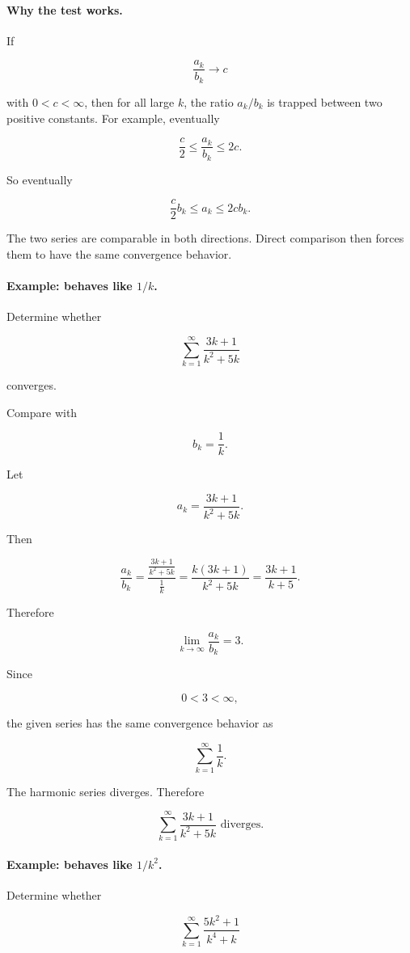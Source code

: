 \paragraph{Why the test works.}
If

\[
\frac{a_k}{b_k}\to c
\]

with \(0<c<\infty\), then for all large \(k\), the ratio \(a_k/b_k\) is trapped between two
positive constants.  For example, eventually

\[
\frac c2\le \frac{a_k}{b_k}\le 2c.
\]

So eventually

\[
\frac c2 b_k\le a_k\le 2c b_k.
\]

The two series are comparable in both directions.  Direct comparison then forces them
to have the same convergence behavior.

\paragraph{Example: behaves like \(1/k\).}
Determine whether

\[
\sum_{k=1}^{\infty}\frac{3k+1}{k^2+5k}
\]

converges.

Compare with

\[
b_k=\frac1k.
\]

Let

\[
a_k=\frac{3k+1}{k^2+5k}.
\]

Then

\[
\frac{a_k}{b_k}
=
\frac{\frac{3k+1}{k^2+5k}}{\frac1k}
=
\frac{k(3k+1)}{k^2+5k}
=
\frac{3k+1}{k+5}.
\]

Therefore

\[
\lim_{k\to\infty}\frac{a_k}{b_k}=3.
\]

Since

\[
0<3<\infty,
\]

the given series has the same convergence behavior as

\[
\sum_{k=1}^{\infty}\frac1k.
\]

The harmonic series diverges.  Therefore

\[
\boxed{
\sum_{k=1}^{\infty}\frac{3k+1}{k^2+5k} \text{ diverges.}
}
\]

\paragraph{Example: behaves like \(1/k^2\).}
Determine whether

\[
\sum_{k=1}^{\infty}\frac{5k^2+1}{k^4+k}
\]

